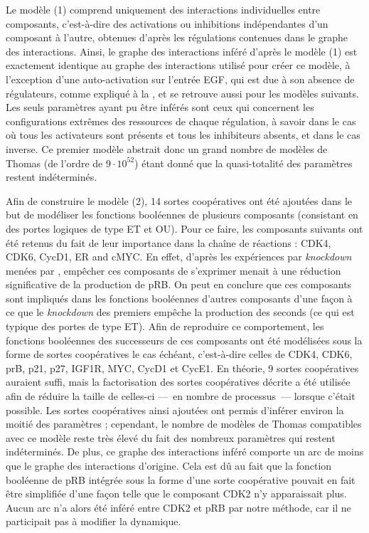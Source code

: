 Le modèle (1) comprend uniquement des interactions individuelles entre composants,
c'est-à-dire des activations ou inhibitions indépendantes d'un composant à l'autre,
obtenues d'après les régulations contenues dans le graphe des interactions.
Ainsi, le graphe des interactions inféré d'après le modèle (1) est exactement identique
au graphe des interactions utilisé pour créer ce modèle,
à l'exception d'une auto-activation sur l'entrée EGF,
qui est due à son absence de régulateurs,
comme expliqué à la ,
et se retrouve aussi pour les modèles suivants.
Les seuls paramètres ayant pu être inférés sont ceux qui concernent les configurations extrêmes
des ressources de chaque régulation,
à savoir dans le cas où tous les activateurs sont présents et tous les inhibiteurs absents,
et dans le cas inverse.
Ce premier modèle abstrait donc un grand nombre de modèles de Thomas
(de l'ordre de $9\cdot10^{52}$)
étant donné que la quasi-totalité des paramètres restent indéterminés.

Afin de construire le modèle (2), 14 sortes coopératives ont été ajoutées dans le but de
modéliser les fonctions booléennes de plusieurs composants (consistant en des portes logiques
de type ET et OU).
Pour ce faire, les composants suivants ont été retenus du fait de leur importance dans la
chaîne de réactions : CDK4, CDK6, CycD1, ER\nbd \textalpha{} and c\nbd MYC.
En effet, d'après les expériences par \textit{knockdown} menées par ,
empêcher ces composants de s'exprimer menait à une réduction significative de la production
de pRB.
On peut en conclure que ces composants sont impliqués dans les fonctions booléennes
d'autres composants d'une façon à ce que le \textit{knockdown} des premiers
empêche la production des seconds (ce qui est typique des portes de type ET).
Afin de reproduire ce comportement, les fonctions booléennes des successeurs de ces composants
ont été modélisées sous la forme de sortes coopératives le cas échéant, c'est-à-dire celles de
CDK4, CDK6, prB, p21, p27, IGF1R, MYC, CycD1 et CycE1.
En théorie, 9 sortes coopératives auraient suffi, mais la factorisation des sortes coopératives
décrite  a été utilisée afin de réduire la taille de celles-ci
---~en nombre de processus~--- lorsque c'était possible.
Les sortes coopératives ainsi ajoutées ont permis d'inférer environ la moitié des paramètres ;
cependant, le nombre de modèles de Thomas compatibles avec ce modèle reste très élevé
du fait des nombreux paramètres qui restent indéterminés.
De plus, ce graphe des interactions inféré comporte un arc de moins que
le graphe des interactions d'origine.
Cela est dû au fait que la fonction booléenne de pRB intégrée sous la forme
d'une sorte coopérative pouvait en fait être simplifiée
d'une façon telle que le composant CDK2 n'y apparaissait plus.
Aucun arc n'a alors été inféré entre CDK2 et pRB par notre méthode,
car il ne participait pas à modifier la dynamique.

